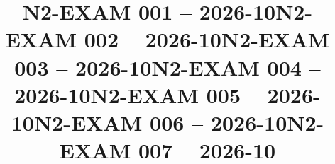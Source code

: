 \documentclass{ip-exam}
\title{N2-EXAM 001 -- 2026-10}
\begin{document}
\makeexamheader








\cleartoeven
\setcounter{questioncounter}{0}
\setcounter{page}{1}
\title{N2-EXAM 002 -- 2026-10}
\makeexamheader








\cleartoeven
\setcounter{questioncounter}{0}
\setcounter{page}{1}
\title{N2-EXAM 003 -- 2026-10}
\makeexamheader








\cleartoeven
\setcounter{questioncounter}{0}
\setcounter{page}{1}
\title{N2-EXAM 004 -- 2026-10}
\makeexamheader








\cleartoeven
\setcounter{questioncounter}{0}
\setcounter{page}{1}
\title{N2-EXAM 005 -- 2026-10}
\makeexamheader








\cleartoeven
\setcounter{questioncounter}{0}
\setcounter{page}{1}
\title{N2-EXAM 006 -- 2026-10}
\makeexamheader








\cleartoeven
\setcounter{questioncounter}{0}
\setcounter{page}{1}
\title{N2-EXAM 007 -- 2026-10}
\makeexamheader
\end{document}
